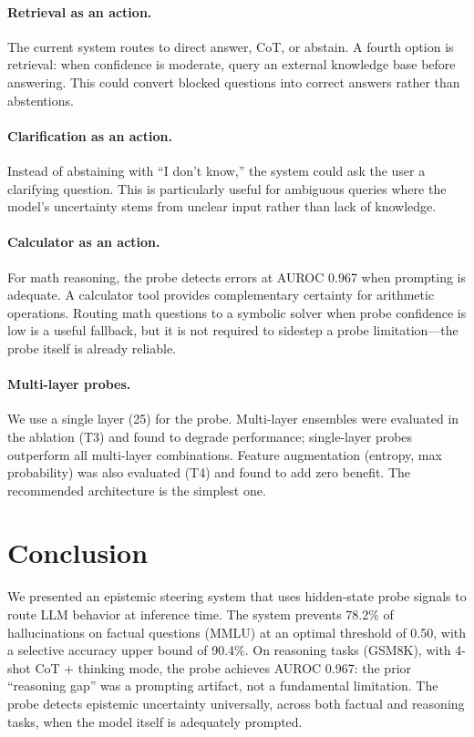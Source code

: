 \documentclass{article}
\begin{document}
\paragraph{Retrieval as an action.}
The current system routes to direct answer, CoT, or abstain. A fourth option is retrieval: when confidence is moderate, query an external knowledge base before answering. This could convert blocked questions into correct answers rather than abstentions.

\paragraph{Clarification as an action.}
Instead of abstaining with ``I don't know,'' the system could ask the user a clarifying question. This is particularly useful for ambiguous queries where the model's uncertainty stems from unclear input rather than lack of knowledge.

\paragraph{Calculator as an action.}
For math reasoning, the probe detects errors at AUROC 0.967 when prompting is adequate. A calculator tool provides complementary certainty for arithmetic operations. Routing math questions to a symbolic solver when probe confidence is low is a useful fallback, but it is not required to sidestep a probe limitation—the probe itself is already reliable.

\paragraph{Multi-layer probes.}
We use a single layer (25) for the probe. Multi-layer ensembles were evaluated in the ablation (T3) and found to degrade performance; single-layer probes outperform all multi-layer combinations. Feature augmentation (entropy, max probability) was also evaluated (T4) and found to add zero benefit. The recommended architecture is the simplest one.

\section{Conclusion}

We presented an epistemic steering system that uses hidden-state probe signals to route LLM behavior at inference time. The system prevents 78.2\% of hallucinations on factual questions (MMLU) at an optimal threshold of 0.50, with a selective accuracy upper bound of 90.4\%. On reasoning tasks (GSM8K), with 4-shot CoT + thinking mode, the probe achieves AUROC 0.967: the prior ``reasoning gap'' was a prompting artifact, not a fundamental limitation. The probe detects epistemic uncertainty universally, across both factual and reasoning tasks, when the model itself is adequately prompted.
\end{document}
